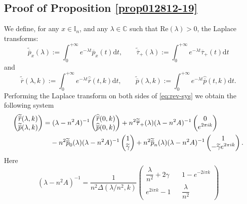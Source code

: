 \documentclass[EJP]{ejpecp} %
\newcommand\T{{\mathbb I}}
\newcommand \ga{\gamma}
\newcommand \la{\lambda}
\newcommand{\dd  }{\mathrm{d}}
\renewcommand{\tilde}{\widetilde}
\renewcommand{\bar}{\overline}
\numberwithin{equation}{section}
\begin{document}


%
\subsection{Proof of Proposition \ref{prop012812-19}}
\label{sec7}
We define, for any $x \in \T_n$,  and any $\lambda \in \mathbb{C}$ such that $\mathrm{Re}(\lambda) >0$, the Laplace transforms:
$$
\tilde{\bar p}_x(\la):=\int_0^{+\infty}e^{-\la t}{\bar p}_x(t)\dd
t,\qquad \tilde{\bar \tau}_+(\la):=\int_0^{+\infty}e^{-\la t}{\bar \tau}_+(t)\dd t
$$
and
$$
\tilde{{\bar r}}(\la,k):=\int_0^{+\infty}e^{-\la t}\widehat{\bar r}(t,k)\dd t,\qquad \tilde{{\bar p}}(\la,k):=\int_0^{+\infty}e^{-\la t}\widehat{\bar p}(t,k)\dd t.
$$
Performing the Laplace transform on both sides of \eqref{eq:rev-sys}
we obtain the following system
\begin{align}
  \label{eq:rev-sys-laplace1}
 \begin{pmatrix}
\tilde{{\bar r}}(\la,k)\\
\tilde{{\bar p}}(\la,k)
 \end{pmatrix}
   = &\; (\la-n^2A)^{-1}    
   \begin{pmatrix}
\widehat{\bar r}(0,k)\\
\widehat{\bar p}(0,k)
 \end{pmatrix}+n^2\tilde{\bar \tau}_+(\la) (\la-n^2A)^{-1} \begin{pmatrix}
0\\
e^{2\pi i  k}
 \end{pmatrix}\\
&
-n^2\tilde{\bar p}_0(\la) (\la-n^2A)^{-1}\begin{pmatrix}
1\\
\tilde\gamma
 \end{pmatrix} + n^2\tilde{\bar p}_n(\la) (\la-n^2A)^{-1}\begin{pmatrix}
1\\
-\tilde\gamma e^{2\pi i  k}
 \end{pmatrix}. \notag \end{align}
Here
$$
(\la-n^2A)^{-1}= \frac{1}{n^2\Delta(\la/n^2,k)}
\begin{pmatrix}
\dfrac{\la}{n^2}+2\ga & &1 - e^{-2i\pi k}\\
e^{2i\pi k}-1&&\dfrac{\la}{n^2}
\end{pmatrix}
$$
\end{document}
